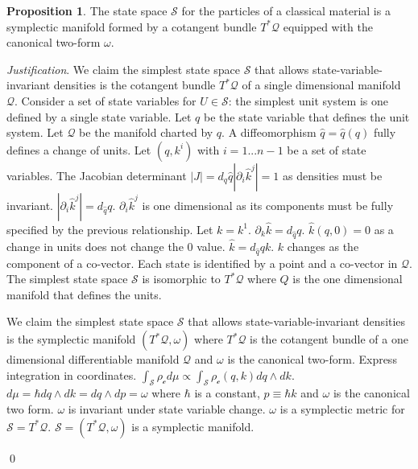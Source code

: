 \documentclass[aps,pra,10pt,twocolumn,floatfix,nofootinbib]{revtex4-1}
\numberwithin{equation}{section}
\theoremstyle{definition}
\newtheorem{prop}[equation]{Proposition}
\newenvironment{justification}{\emph{Justification}.}{\qed}
\begin{document}
\begin{prop}\label{symplectic_manifold}
The state space $\mathcal{S}$ for the particles of a classical material is a symplectic manifold formed by a cotangent bundle $T^*\mathcal{Q}$ equipped with the canonical two-form $\omega$.
\end{prop}

\begin{justification}
	We claim the simplest state space $\mathcal{S}$ that allows state-variable-invariant densities is the cotangent bundle $T^*\mathcal{Q}$ of a single dimensional manifold $\mathcal{Q}$. Consider a set of state variables for $U \in \mathcal{S}$: the simplest unit system is one defined by a single state variable. Let $q$ be the state variable that defines the unit system. Let $\mathcal{Q}$ be the manifold charted by $q$. A diffeomorphism $\hat{q}=\hat{q}(q)$ fully defines a change of units. Let $(q,k^i)$ with $i=1...n-1$ be a set of state variables. The Jacobian determinant $|J| = d_q\hat{q} |\partial_i\hat{k}^j|=1$ as densities must be invariant. $|\partial_i \hat{k}^j| = d_{\hat{q}}q$. $\partial_i \hat{k}^j$ is one dimensional as its components must be fully specified by the previous relationship. Let $k=k^1$. $\partial_k \hat{k} = d_{\hat{q}}q$. $\hat{k}(q,0) = 0$ as a change in units does not change the $0$ value. $\hat{k} = d_{\hat{q}}q k$. $k$ changes as the component of a co-vector. Each state is identified by a point and a co-vector in $\mathcal{Q}$. The simplest state space $\mathcal{S}$ is isomorphic to $T^*\mathcal{Q}$ where $Q$ is the one dimensional manifold that defines the units.
	
	We claim the simplest state space $\mathcal{S}$ that allows state-variable-invariant densities is the symplectic manifold $(T^*\mathcal{Q}, \omega)$ where $T^*\mathcal{Q}$ is the cotangent bundle of a one dimensional differentiable manifold $\mathcal{Q}$ and $\omega$ is the canonical two-form. Express integration in coordinates. $\int_{\mathcal{S}} \rho_\mathcal{c} d\mu \propto \int_{\mathcal{S}} \rho_\mathcal{c}(q, k) dq \wedge dk$. $d\mu = \hbar dq \wedge dk = dq \wedge dp = \omega$ where $\hbar$ is a constant, $p\equiv \hbar k$  and $\omega$ is the canonical two form. $\omega$ is invariant under state variable change. $\omega$ is a symplectic metric for $\mathcal{S}=T^*\mathcal{Q}$. $\mathcal{S} = (T^*\mathcal{Q}, \omega)$ is a symplectic manifold.
	

\end{justification}
\end{document}
